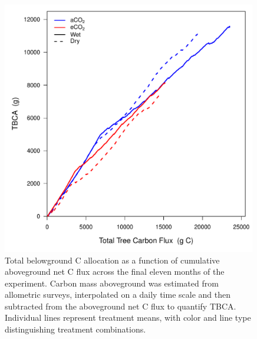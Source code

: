 \documentclass[a4paper]{article}\usepackage[]{graphicx}\usepackage[]{color}
\begin{document}
\begin{figure}[h!]
    \centering
    \includegraphics[width=0.99\textwidth]{tbca_cflux.pdf}
    \caption{Total belowground C allocation as a function of cumulative aboveground net C flux across the final eleven months of the experiment. Carbon mass aboveground was estimated from allometric surveys, interpolated on a daily time scale and then subtracted from the aboveground net C flux to quantify TBCA. Individual lines represent treatment means, with color and line type distinguishing treatment combinations.}
    \label{fig:figure 4.8}
\end{figure}
\end{document}
